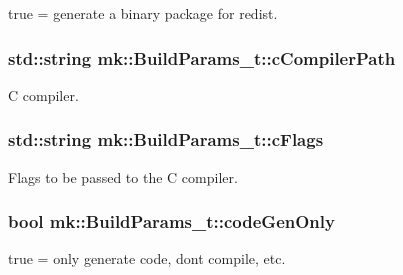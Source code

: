true = generate a binary package for redist. 

\subsubsection[{\texorpdfstring{c\+Compiler\+Path}{cCompilerPath}}]{\setlength{\rightskip}{0pt plus 5cm}std\+::string mk\+::\+Build\+Params\+\_\+t\+::c\+Compiler\+Path}\hypertarget{structmk_1_1_build_params__t_a37af652ccbc4cd2c32d8b23e60bb40c8}{}\label{structmk_1_1_build_params__t_a37af652ccbc4cd2c32d8b23e60bb40c8}


C compiler. 

\subsubsection[{\texorpdfstring{c\+Flags}{cFlags}}]{\setlength{\rightskip}{0pt plus 5cm}std\+::string mk\+::\+Build\+Params\+\_\+t\+::c\+Flags}\hypertarget{structmk_1_1_build_params__t_a0dd5594abb94c402aced93580c0ed837}{}\label{structmk_1_1_build_params__t_a0dd5594abb94c402aced93580c0ed837}


Flags to be passed to the C compiler. 

\subsubsection[{\texorpdfstring{code\+Gen\+Only}{codeGenOnly}}]{\setlength{\rightskip}{0pt plus 5cm}bool mk\+::\+Build\+Params\+\_\+t\+::code\+Gen\+Only}\hypertarget{structmk_1_1_build_params__t_a62f5299b57d9e1f2b4b7f9aa9abda5df}{}\label{structmk_1_1_build_params__t_a62f5299b57d9e1f2b4b7f9aa9abda5df}


true = only generate code, don\textquotesingle{}t compile, etc. 

